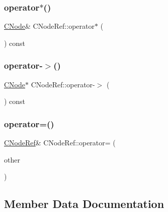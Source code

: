 \subsubsection{\texorpdfstring{operator$\ast$()}{operator*()}}
{\footnotesize\ttfamily \mbox{\hyperlink{class_c_node}{C\+Node}}\& C\+Node\+Ref\+::operator$\ast$ (\begin{DoxyParamCaption}{ }\end{DoxyParamCaption}) const\hspace{0.3cm}{\ttfamily [inline]}}

\mbox{\label{class_c_node_ref_a632d60ec3c8f5067175495f7e16792e4}} 
\subsubsection{\texorpdfstring{operator-\/$>$()}{operator->()}}
{\footnotesize\ttfamily \mbox{\hyperlink{class_c_node}{C\+Node}}$\ast$ C\+Node\+Ref\+::operator-\/$>$ (\begin{DoxyParamCaption}{ }\end{DoxyParamCaption}) const\hspace{0.3cm}{\ttfamily [inline]}}

\mbox{\label{class_c_node_ref_a317447d0593bd0257b7dedbd179031fb}} 
\subsubsection{\texorpdfstring{operator=()}{operator=()}}
{\footnotesize\ttfamily \mbox{\hyperlink{class_c_node_ref}{C\+Node\+Ref}}\& C\+Node\+Ref\+::operator= (\begin{DoxyParamCaption}\item[{const \mbox{\hyperlink{class_c_node_ref}{C\+Node\+Ref}} \&}]{other }\end{DoxyParamCaption})\hspace{0.3cm}{\ttfamily [inline]}}



\subsection{Member Data Documentation}
\mbox{\label{class_c_node_ref_a61a5998bc18a3aecd159d9786464480c}} 
